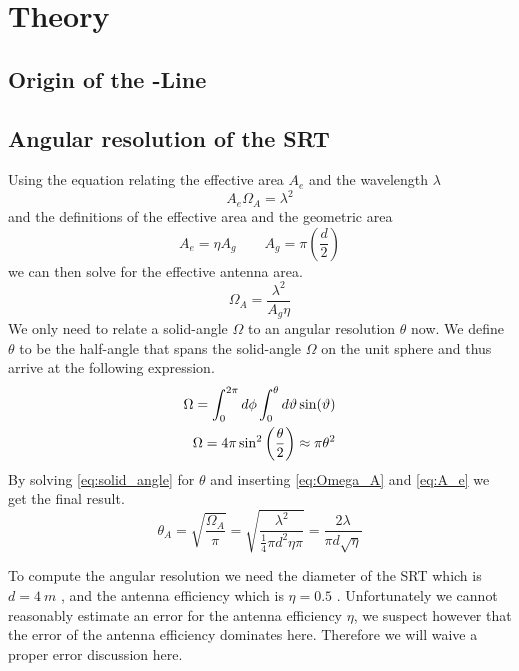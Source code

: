 \section{Theory}




\subsection[Origin of the HI-Line]{Origin of the -Line}

\subsection{Angular resolution of the SRT}\label{sec:ang_res}
Using the equation relating the effective area $A_e$ and the wavelength $\lambda$ \cite[p. 149]{wilson}
\begin{equation}
    A_e \Omega_A = \lambda^2
\end{equation}
and the definitions of the effective area and the geometric area \cite[p. 148]{wilson}
\begin{equation}
    A_e = \eta A_g \qquad A_g = \pi \left( \frac{d}{2} \right) \label{eq:A_e}
\end{equation}
we can then solve for the effective antenna area.
\begin{equation}
    \Omega_A = \frac{\lambda^2}{A_g \eta} \label{eq:Omega_A}
\end{equation}
We only need to relate a solid-angle $\Omega$ to an angular resolution $\theta$ now. We define $\theta$ to be the half-angle that spans the solid-angle $\Omega$ on the unit sphere and thus arrive at the following expression.
\begin{align}
    \Omega = \int_{0}^{2\pi} d\phi \int_{0}^{\theta} d\vartheta \sin(\vartheta) \notag \\
    \Omega = 4 \pi \sin^2 \left( \frac{\theta}{2} \right) \approx \pi \theta^2 \label{eq:solid_angle}
\end{align}
By solving \eqref{eq:solid_angle} for $\theta$ and inserting \eqref{eq:Omega_A} and \eqref{eq:A_e} we get the final result.
\begin{equation}
    \theta_A = \sqrt{\frac{\Omega_A}{\pi}} = \sqrt{\frac{\lambda^2}{\frac{1}{4} \pi d^2 \eta \pi}} = \frac{2\lambda}{\pi d \sqrt{\eta}} \label{eq:half_angle}
\end{equation}

To compute the angular resolution we need the diameter of the SRT which is $d = \SI{4}{m}$ \cite[p. 4]{srt}, and the antenna efficiency which is $\eta = 0.5$ \cite[p. 2]{srt}.
Unfortunately we cannot reasonably estimate an error for the antenna efficiency $\eta$, we suspect however that the error of the antenna efficiency dominates here.
Therefore we will waive a proper error discussion here.

